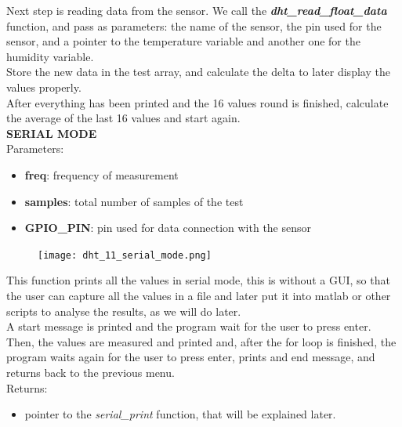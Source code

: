 \documentclass[14pt]{article}
\begin{document}
\begin{normalsize}
		\noindent Next step is reading data from the sensor. We call the \textit{\textbf{dht\_read\_float\_data}} function, and pass as parameters: the name of the sensor,
		the pin used for the sensor, and a pointer to the temperature variable and another one for the humidity variable.\vspace{5pt}\\
		
		\noindent Store the new data in the test array, and calculate the delta to later display the values properly.\\
		After everything has been printed and the 16 values round is finished, calculate the average of the last 16 values and start again.\\
		
		\noindent\large \textbf{SERIAL MODE}\normalsize\\
		
		Parameters:
		\begin{itemize}
			\item \textbf{freq}: frequency of measurement
			\item \textbf{samples}: total number of samples of the test
			\item \textbf{GPIO\_PIN}: pin used for data connection with the sensor
		\end{itemize}
		
		\begin{figure}
			\begin{center}
				\texttt{[image: dht\_11\_serial\_mode.png]}
			\end{center}
		\end{figure}
		\noindent This function prints all the values in serial mode, this is without a GUI, so that the user can capture all the values in a file and later put it into matlab or other scripts to analyse the results, as we will do later.\\
		
		\noindent A start message is printed and the program wait for the user to press enter. Then, the values are measured and printed and, after the for loop is finished, the program waits again for the user to press enter, prints and end message, and returns back to the previous menu.\\
		
		Returns:
		\begin{itemize}
			\item pointer to the \textit{serial\_print} function, that will be explained later.
		\end{itemize}
				

\end{normalsize}
\end{document}
